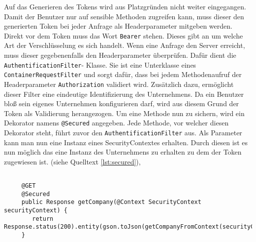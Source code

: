 Auf das Generieren des Tokens wird aus Platzgründen nicht weiter eingegangen. 
Damit der Benutzer nur auf sensible Methoden zugreifen kann, muss dieser den generierten Token bei jeder Anfrage als Headerparameter mitgeben werden. Direkt vor dem Token muss das Wort \texttt{Bearer} stehen. Dieses gibt an um welche Art der Verschlüsselung es sich handelt.
Wenn eine Anfrage den Server erreicht, muss dieser gegebenenfalls den Headerparameter überprüfen.
Dafür dient die \texttt{AuthentificationFilter}- Klasse. Sie ist eine Unterklasse eines \texttt{ContainerRequestFilter} und sorgt dafür, dass bei jedem Methodenaufruf der Headerparameter \texttt{Authorization} validiert wird. Zusätzlich dazu, ermöglicht dieser Filter eine eindeutige Identifizierung des Unternehmens. 
Da ein Benutzer bloß sein eigenes Unternehmen konfigurieren darf, wird aus diesem Grund der Token als Validierung herangezogen.
Um eine Methode nun zu sichern, wird ein Dekorator namens \texttt{@Secured} angegeben. Jede Methode, vor welcher diesen Dekorator steht, führt zuvor den \texttt{AuthentificationFilter} aus.
Als Parameter kann man nun eine Instanz eines SecurityContextes erhalten. Durch diesen ist es nun möglich das eine Instanz des Unternehmens zu erhalten zu dem der Token zugewiesen ist. (siehe Quelltext \ref{lst:secured}),

 \lstset{language=JAVA}
 \begin{lstlisting}[float=htbp, caption={Beispiel des \texttt{@Secured}-Dekorators }, label={lst:secured}]
 
	 @GET
	 @Secured
	 public Response getCompany(@Context SecurityContext securityContext) {
	 	return Response.status(200).entity(gson.toJson(getCompanyFromContext(securityContext))).build();
	 }
 \end{lstlisting}
 

